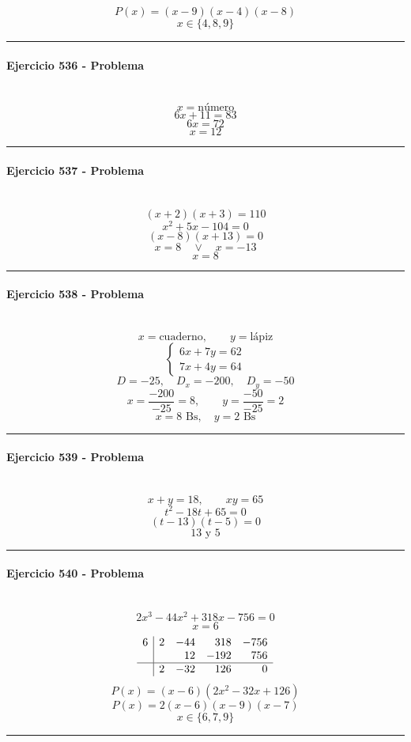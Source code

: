 \documentclass[10pt,a4paper]{article}
\newcommand{\res}[1]{\paragraph{#1}\mbox{}\\[-1.2em]}
\begin{document}
\[ P(x)=(x-9)(x-4)(x-8) \]
\[ \boxed{x\in\{4,8,9\}} \]
\vspace{1mm}\hrule\vspace{2mm}
\res{Ejercicio 536 - Problema}
\[ x=\text{número} \]
\[ 6x+11=83 \]
\[ 6x=72 \]
\[ \boxed{x=12} \]
\vspace{1mm}\hrule\vspace{2mm}
\res{Ejercicio 537 - Problema}
\[ (x+2)(x+3)=110 \]
\[ x^{2} + 5 x - 104=0 \]
\[ (x-8)(x+13)=0 \]
\[ x=8\quad \vee \quad x=-13 \]
\[ \boxed{x=8} \]
\vspace{1mm}\hrule\vspace{2mm}
\res{Ejercicio 538 - Problema}
\[ x=\text{cuaderno},\qquad y=\text{lápiz} \]
\[ \begin{cases}6x+7y=62\\7x+4y=64\end{cases} \]
\[ D=-25,\quad D_x=-200,\quad D_y=-50 \]
\[ x=\frac{-200}{-25}=8,\qquad y=\frac{-50}{-25}=2 \]
\[ \boxed{x=8\text{ Bs},\quad y=2\text{ Bs}} \]
\vspace{1mm}\hrule\vspace{2mm}
\res{Ejercicio 539 - Problema}
\[ x+y=18,\qquad xy=65 \]
\[ t^2-18t+65=0 \]
\[ (t-13)(t-5)=0 \]
\[ \boxed{13\text{ y }5} \]
\vspace{1mm}\hrule\vspace{2mm}
\res{Ejercicio 540 - Problema}
\[ 2 x^{3} - 44 x^{2} + 318 x - 756=0 \]
\[ x=6 \]
\[\begin{array}{r|rrrr}6 & 2 & -44 & 318 & -756\\  &  & 12 & -192 & 756\\\hline  & 2 & -32 & 126 & 0\end{array}\]
\[ P(x)=(x-6)(2 x^{2} - 32 x + 126) \]
\[ P(x)=2(x-6)(x-9)(x-7) \]
\[ \boxed{x\in\{6,7,9\}} \]
\vspace{1mm}\hrule\vspace{2mm}
\end{document}
